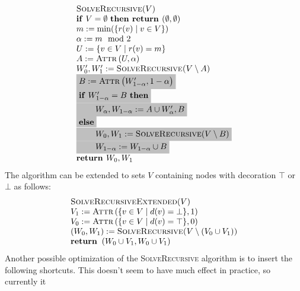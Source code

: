 \documentclass{article}
\begin{document}
\begin{equation*}
\begin{array}{l}
\textsc{SolveRecursive}(V) \\ 
\text{\textbf{if} }V=\emptyset \text{ \textbf{then return }}(\emptyset
,\emptyset ) \\ 
m:=\min (\{r(v)\mid v\in V\}) \\ 
\alpha :=m \mod 2 \\ 
U:=\{v\in V\mid r(v)=m\} \\ 
A:=\text{\textsc{Attr}}\left( U,\alpha \right)  \\ 
W_{0}^{\prime },W_{1}^{\prime }:=\text{\textsc{SolveRecursive(}}V\setminus A%
\text{)} \\
\colorbox{lightgray}{$
B:=\text{\textsc{Attr}}\left( W_{1-\alpha }^{\prime },1-\alpha \right) $}\\ 
\colorbox{lightgray}{$
\text{\textbf{if} }W_{1-\alpha }^{\prime }=B\text{ \textbf{then}} $}\\ 
\colorbox{lightgray}{$
\qquad W_{\alpha },W_{1-\alpha }:=A\cup W_{\alpha }^{\prime },B $}\\ 
\colorbox{lightgray}{$
\text{\textbf{else}} $}\\ 
\colorbox{lightgray}{$
\qquad W_{0},W_{1}:=\textsc{SolveRecursive}(V \setminus B)$}\\ 
\colorbox{lightgray}{$
\qquad W_{1-\alpha }:=W_{1-\alpha }\cup B $}\\ 
\text{\textbf{return }}W_{0},W_{1}
\end{array}
\end{equation*}
The algorithm can be extended to sets $V$ containing nodes with decoration $%
\top $ or $\bot $ as follows:%
\begin{equation*}
\begin{array}{l}
\textsc{SolveRecursiveExtended}(V) \\ 
V_{1}:=\textsc{Attr}\left( \{v\in V\mid d(v) = \bot \},1\right) \\ 
V_{0}:=\textsc{Attr}\left( \{v\in V\mid d(v) = \top \},0\right) \\ 
\left( W_{0},W_{1}\right) :=\text{\textsc{SolveRecursive(}}V\setminus
(V_{0}\cup V_{1})\text{\textsc{)}} \\ 
\text{\textbf{return }}\left( W_{0}\cup V_{1},W_{0}\cup V_{1}\right)%
\end{array}
\end{equation*}
Another possible optimization of the \textsc{SolveRecursive} algorithm is to insert the
following shortcuts. This doesn't seem to have much effect in practice, so currently it
\end{document}
